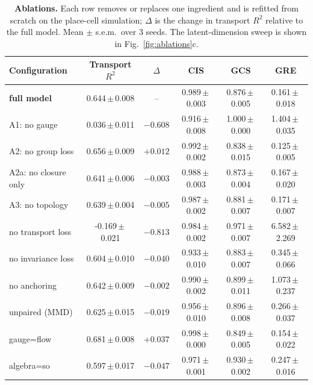 \begin{table}[t]
\centering
\caption{\textbf{Ablations.} Each row removes or replaces one ingredient and is refitted from scratch on the place-cell simulation; $\Delta$ is the change in transport $R^2$ relative to the full model. Mean $\pm$ s.e.m.\ over 3 seeds. The latent-dimension sweep is shown in Fig.~\ref{fig:ablations}c.}
\label{tab:ablations}
\vspace{2pt}
\small
\begin{tabular}{lccccc}
\toprule
Configuration & Transport $R^2$ & $\Delta$ & CIS & GCS & GRE \\
\midrule
\textbf{full model} & 0.644\,\tiny{$\pm$\,0.008} & -- & 0.989\,\tiny{$\pm$\,0.003} & 0.876\,\tiny{$\pm$\,0.005} & 0.161\,\tiny{$\pm$\,0.018} \\
\midrule
A1: no gauge & 0.036\,\tiny{$\pm$\,0.011} & $-0.608$ & 0.916\,\tiny{$\pm$\,0.008} & 1.000\,\tiny{$\pm$\,0.000} & 1.404\,\tiny{$\pm$\,0.035} \\
A2: no group loss & 0.656\,\tiny{$\pm$\,0.009} & $+0.012$ & 0.992\,\tiny{$\pm$\,0.002} & 0.838\,\tiny{$\pm$\,0.015} & 0.125\,\tiny{$\pm$\,0.005} \\
A2a: no closure only & 0.641\,\tiny{$\pm$\,0.006} & $-0.003$ & 0.988\,\tiny{$\pm$\,0.003} & 0.873\,\tiny{$\pm$\,0.004} & 0.167\,\tiny{$\pm$\,0.020} \\
A3: no topology & 0.639\,\tiny{$\pm$\,0.004} & $-0.005$ & 0.987\,\tiny{$\pm$\,0.002} & 0.881\,\tiny{$\pm$\,0.007} & 0.171\,\tiny{$\pm$\,0.007} \\
no transport loss & -0.169\,\tiny{$\pm$\,0.021} & $-0.813$ & 0.984\,\tiny{$\pm$\,0.002} & 0.971\,\tiny{$\pm$\,0.007} & 6.582\,\tiny{$\pm$\,2.269} \\
no invariance loss & 0.604\,\tiny{$\pm$\,0.010} & $-0.040$ & 0.933\,\tiny{$\pm$\,0.010} & 0.883\,\tiny{$\pm$\,0.007} & 0.345\,\tiny{$\pm$\,0.066} \\
no anchoring & 0.642\,\tiny{$\pm$\,0.009} & $-0.002$ & 0.990\,\tiny{$\pm$\,0.002} & 0.899\,\tiny{$\pm$\,0.011} & 1.073\,\tiny{$\pm$\,0.237} \\
unpaired (MMD) & 0.625\,\tiny{$\pm$\,0.015} & $-0.019$ & 0.956\,\tiny{$\pm$\,0.010} & 0.896\,\tiny{$\pm$\,0.008} & 0.266\,\tiny{$\pm$\,0.037} \\
gauge=flow & 0.681\,\tiny{$\pm$\,0.008} & $+0.037$ & 0.998\,\tiny{$\pm$\,0.000} & 0.849\,\tiny{$\pm$\,0.005} & 0.154\,\tiny{$\pm$\,0.022} \\
algebra=so & 0.597\,\tiny{$\pm$\,0.017} & $-0.047$ & 0.971\,\tiny{$\pm$\,0.001} & 0.930\,\tiny{$\pm$\,0.002} & 0.247\,\tiny{$\pm$\,0.016} \\

\end{tabular}
\end{table}
